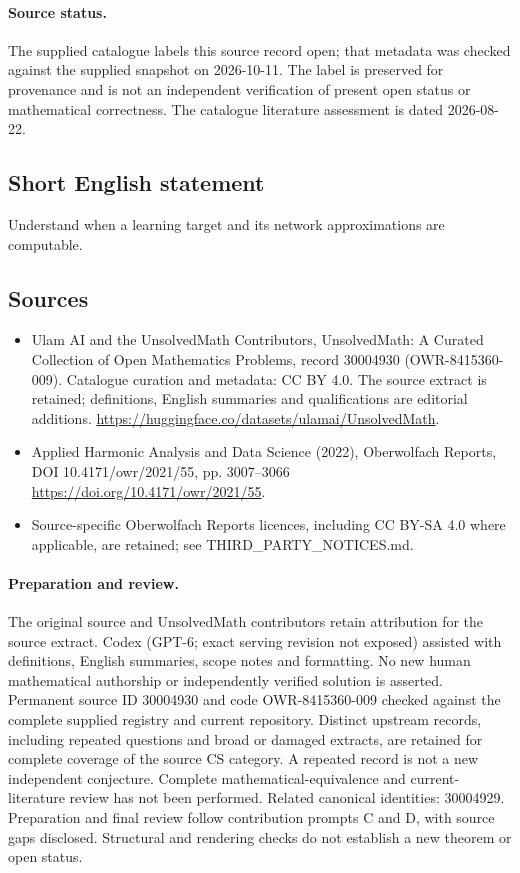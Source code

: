 \documentclass[11pt]{article}
\begin{document}
\paragraph{Source status.}
The supplied catalogue labels this source record open; that metadata was checked against the supplied snapshot on 2026-10-11. The label is preserved for provenance and is not an independent verification of present open status or mathematical correctness. The catalogue literature assessment is dated 2026-08-22.
\subsection{Short English statement}
Understand when a learning target and its network approximations are computable.
\subsection{Sources}
\begin{itemize}
\item[\hypertarget{source:30004930:1}{S1}] Ulam AI and the UnsolvedMath Contributors, UnsolvedMath: A Curated Collection of Open Mathematics Problems, record 30004930 (OWR-8415360-009). Catalogue curation and metadata: CC BY 4.0. The source extract is retained; definitions, English summaries and qualifications are editorial additions.
\url{https://huggingface.co/datasets/ulamai/UnsolvedMath}.
\item[\hypertarget{source:30004930:2}{S2}] Applied Harmonic Analysis and Data Science (2022), Oberwolfach Reports, DOI 10.4171/owr/2021/55, pp. 3007--3066
\url{https://doi.org/10.4171/owr/2021/55}.
\item Source-specific Oberwolfach Reports licences, including CC BY-SA 4.0 where applicable, are retained; see THIRD\_PARTY\_NOTICES.md.
\end{itemize}
\paragraph{Preparation and review.}
The original source and UnsolvedMath contributors retain attribution for the source extract. Codex (GPT-6; exact serving revision not exposed) assisted with definitions, English summaries, scope notes and formatting. No new human mathematical authorship or independently verified solution is asserted. Permanent source ID 30004930 and code OWR-8415360-009 checked against the complete supplied registry and current repository. Distinct upstream records, including repeated questions and broad or damaged extracts, are retained for complete coverage of the source CS category. A repeated record is not a new independent conjecture. Complete mathematical-equivalence and current-literature review has not been performed. Related canonical identities: 30004929. Preparation and final review follow contribution prompts C and D, with source gaps disclosed. Structural and rendering checks do not establish a new theorem or open status.
\label{end:30004930}
\end{document}
